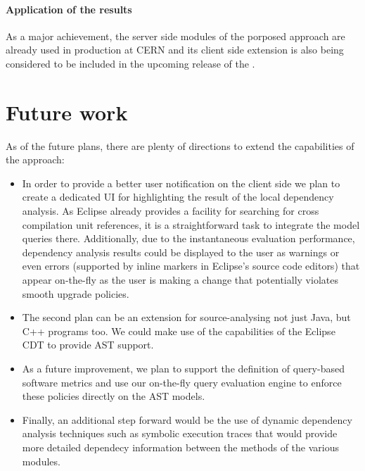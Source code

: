 
% 

\paragraph*{Application of the results}
As a major achievement, the server side modules of the porposed approach are
already used in production at CERN and its client side extension is also being
considered to be included in the upcoming release of the \ptool.

\section{Future work}
As of the future plans, there are plenty of directions to extend the
capabilities of the approach:
\begin{itemize}
\item In order to provide a better user notification on the client side we plan
to create a dedicated UI for highlighting the result of the local dependency
analysis. As Eclipse already provides a facility for searching for cross
compilation unit references, it is a straightforward task to integrate the model
queries there. Additionally, due to the instantaneous evaluation performance,
dependency analysis results could be displayed to the user as warnings or even
errors (supported by inline markers in Eclipse's source code editors) that
appear on-the-fly as the user is making a change that potentially violates
smooth upgrade policies.


\item The second plan can be an extension for source-analysing not just Java,
but C++ programs too. We could make use of the capabilities of the Eclipse CDT
to provide AST support.

\item As a future improvement, we plan to support the definition of query-based
software metrics and use our on-the-fly query evaluation engine to enforce these
policies directly on the AST models.

\item Finally, an additional step forward would be the use of dynamic dependency
analysis techniques such as symbolic execution traces that would provide more
detailed dependecy information between the methods of the various modules.
\end{itemize}
